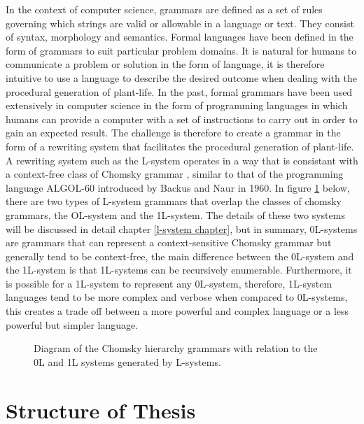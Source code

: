 In the context of computer science, grammars are defined as a set of rules governing which strings are valid or allowable in a language or text. They consist of syntax, morphology and semantics. Formal languages have been defined in the form of grammars to suit particular problem domains. It is natural for humans to communicate a problem or solution in the form of language, it is therefore intuitive to use a language to describe the desired outcome when dealing with the procedural generation of plant-life. In the past, formal grammars have been used extensively in computer science in the form of programming languages in which humans can provide a computer with a set of instructions to carry out in order to gain an expected result. The challenge is therefore to create a  grammar in the form of a rewriting system that facilitates the procedural generation of plant-life. A rewriting system such as the L-system operates in a way that is consistant with a context-free class of Chomsky grammar \cite{chomsky1956three}, similar to that of the programming language ALGOL-60 introduced by Backus and Naur in  1960\cite{backus1960report}. In figure \ref{chomsky grammars} below, there are two types of L-system grammars that overlap the classes of chomsky grammars, the OL-system and the 1L-system. The details of these two systems will be discussed in detail chapter \ref{l-system chapter}, but in summary, 0L-systems are grammars that can represent a context-sensitive Chomsky grammar but generally tend to be context-free, the main difference between the 0L-system and the 1L-system is that 1L-systems can be recursively enumerable. Furthermore, it is possible for a 1L-system to represent any 0L-system, therefore, 1L-system languages tend to be more complex and verbose when compared to 0L-systems, this creates a trade off between a more powerful and complex language or a less powerful but simpler language. 

\begin{figure}[htbp]
	{\centering
		\setlength{\fboxrule}{1pt}
		\vspace{7px}
		\caption{Diagram of the Chomsky hierarchy grammars with relation to the 0L and 1L systems generated by L-systems.} \label{chomsky grammars}
	}
\end{figure}
\FloatBarrier

\section{Structure of Thesis}

